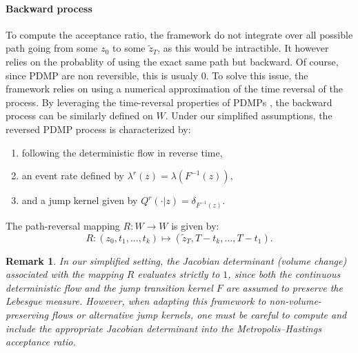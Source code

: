 \documentclass{article}
\newtheorem{remark}{Remark}
\begin{document}
\paragraph{Backward process}
To compute the acceptance ratio, the framework do not integrate over all possible path going from some $z_0$ to some $\tilde{z}_T$, as this would be intractible. It however relies on the probablity of using the exact same path but backward. Of course, since PDMP are non reversible, this is usualy 0. To solve this issue, the framework relies on using a numerical approximation of the time reversal of the process. By leveraging the time-reversal properties of PDMPs \cite{lopker2013}, the backward process can be similarly defined on $W$. Under our simplified assumptions, the reversed PDMP process is characterized by:
\begin{enumerate}
    \item following the deterministic flow in reverse time,
    \item an event rate defined by $\lambda^r(z) = \lambda(F^{-1}(z))$,
    \item and a jump kernel given by $Q^r(\cdot|z) = \delta_{F^{-1}(z)}$.%
\end{enumerate}
The path-reversal mapping $R: W \to W$ is given by:
\[
    R: (z_0, t_1, \dots, t_k) \mapsto (\tilde{z}_T, T - t_k, \dots, T - t_1).
\]
\begin{remark}
    In our simplified setting, the Jacobian determinant (volume change) associated with the mapping $R$ evaluates strictly to $1$, since both the continuous deterministic flow and the jump transition kernel $F$ are assumed to preserve the Lebesgue measure. However, when adapting this framework to non-volume-preserving flows or alternative jump kernels, one must be careful to compute and include the appropriate Jacobian determinant into the Metropolis--Hastings acceptance ratio.
\end{remark}
\end{document}

